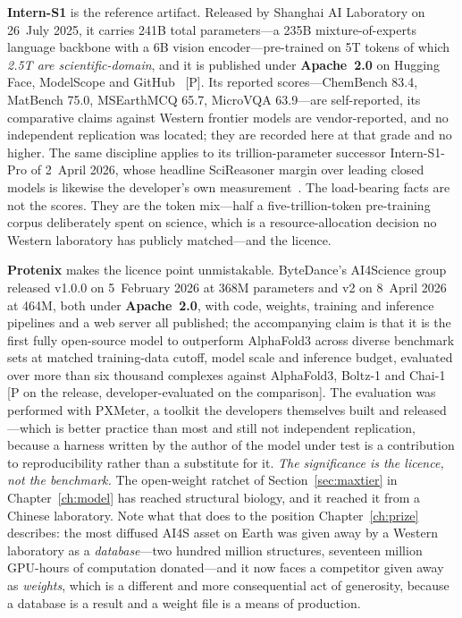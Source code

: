 \textbf{Intern-S1} is the reference artifact. Released by Shanghai AI Laboratory on 26~July 2025, it carries 241B total parameters---a 235B mixture-of-experts language backbone with a 6B vision encoder---pre-trained on 5T tokens of which \emph{2.5T are scientific-domain}, and it is published under \textbf{Apache~2.0} on Hugging Face, ModelScope and GitHub~\cite{intern-s1-2025} [P]. Its reported scores---ChemBench 83.4, MatBench 75.0, MSEarthMCQ 65.7, MicroVQA 63.9---are self-reported, its comparative claims against Western frontier models are vendor-reported, and no independent replication was located; they are recorded here at that grade and no higher. The same discipline applies to its trillion-parameter successor Intern-S1-Pro of 2~April 2026, whose headline SciReasoner margin over leading closed models is likewise the developer's own measurement~\cite{intern-s1}. The load-bearing facts are not the scores. They are the token mix---half a five-trillion-token pre-training corpus deliberately spent on science, which is a resource-allocation decision no Western laboratory has publicly matched---and the licence.

\textbf{Protenix} makes the licence point unmistakable. ByteDance's AI4Science group released v1.0.0 on 5~February 2026 at 368M parameters and v2 on 8~April 2026 at 464M, both under \textbf{Apache~2.0}, with code, weights, training and inference pipelines and a web server all published; the accompanying claim is that it is the first fully open-source model to outperform AlphaFold3 across diverse benchmark sets at matched training-data cutoff, model scale and inference budget, evaluated over more than six thousand complexes against AlphaFold3, Boltz-1 and Chai-1~\cite{protenix} [P on the release, developer-evaluated on the comparison]. The evaluation was performed with PXMeter, a toolkit the developers themselves built and released---which is better practice than most and still not independent replication, because a harness written by the author of the model under test is a contribution to reproducibility rather than a substitute for it. \emph{The significance is the licence, not the benchmark.} The open-weight ratchet of Section~\ref{sec:maxtier} in Chapter~\ref{ch:model} has reached structural biology, and it reached it from a Chinese laboratory. Note what that does to the position Chapter~\ref{ch:prize} describes: the most diffused AI4S asset on Earth was given away by a Western laboratory as a \emph{database}---two hundred million structures, seventeen million GPU-hours of computation donated---and it now faces a competitor given away as \emph{weights}, which is a different and more consequential act of generosity, because a database is a result and a weight file is a means of production.

